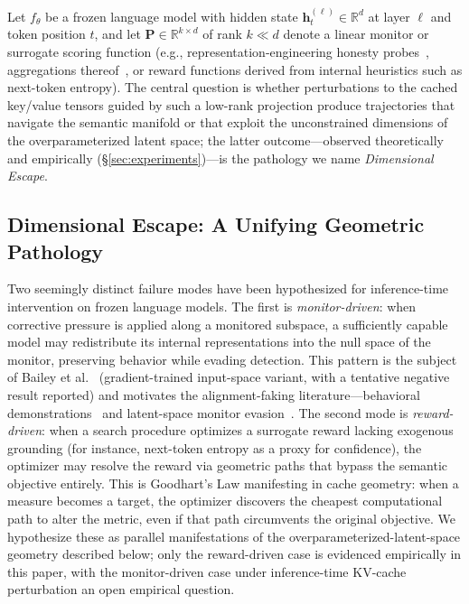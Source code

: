 \documentclass{article}
\begin{document}
Let $f_\theta$ be a frozen language model with hidden state $\mathbf{h}_t^{(\ell)} \in \mathbb{R}^d$ at layer $\ell$ and token position $t$, and let $\mathbf{P} \in \mathbb{R}^{k \times d}$ of rank $k \ll d$ denote a linear monitor or surrogate scoring function (e.g., representation-engineering honesty probes~\cite{zou2023repe}, aggregations thereof~\cite{gupta2025rlobfuscation}, or reward functions derived from internal heuristics such as next-token entropy). The central question is whether perturbations to the cached key/value tensors guided by such a low-rank projection produce trajectories that navigate the semantic manifold or that exploit the unconstrained dimensions of the overparameterized latent space; the latter outcome---observed theoretically and empirically (§\ref{sec:experiments})---is the pathology we name \emph{Dimensional Escape}.

\subsection{Dimensional Escape: A Unifying Geometric Pathology}\label{sec:dim_escape}

Two seemingly distinct failure modes have been hypothesized for inference-time intervention on frozen language models. The first is \emph{monitor-driven}: when corrective pressure is applied along a monitored subspace, a sufficiently capable model may redistribute its internal representations into the null space of the monitor, preserving behavior while evading detection. This pattern is the subject of Bailey et al.~\cite{bailey2024obfuscated} (gradient-trained input-space variant, with a tentative negative result reported) and motivates the alignment-faking literature---behavioral demonstrations~\cite{greenblatt2024alignment, hubinger2024sleeper} and latent-space monitor evasion~\cite{gupta2025rlobfuscation}. The second mode is \emph{reward-driven}: when a search procedure optimizes a surrogate reward lacking exogenous grounding (for instance, next-token entropy as a proxy for confidence), the optimizer may resolve the reward via geometric paths that bypass the semantic objective entirely. This is Goodhart's Law manifesting in cache geometry: when a measure becomes a target, the optimizer discovers the cheapest computational path to alter the metric, even if that path circumvents the original objective. We hypothesize these as parallel manifestations of the overparameterized-latent-space geometry described below; only the reward-driven case is evidenced empirically in this paper, with the monitor-driven case under inference-time KV-cache perturbation an open empirical question.
\end{document}
